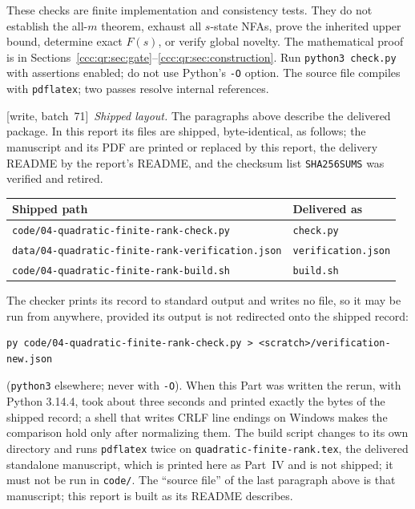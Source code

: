 \documentclass[11pt,letterpaper]{article}
\theoremstyle{definition}
\theoremstyle{remark}
\newcommand{\wsevone}{\textup{[write, batch~71]}}
\begin{document}
These checks are finite implementation and consistency tests. They do not
establish the all-$m$ theorem, exhaust all $s$-state NFAs, prove the
inherited upper bound, determine exact $F(s)$, or verify global novelty. The
mathematical proof is in
Sections~\ref{ccc:qr:sec:gate}--\ref{ccc:qr:sec:construction}. Run
\texttt{python3 check.py} with assertions enabled; do not use Python's
\texttt{-O} option. The source file compiles with \texttt{pdflatex}; two
passes resolve internal references.

\wsevone\ \emph{Shipped layout.} The paragraphs above describe the delivered
package. In this report its files are shipped, byte-identical, as follows;
the manuscript and its PDF are printed or replaced by this report, the
delivery README by the report's README, and the checksum list
\texttt{SHA256SUMS} was verified and retired.
\begin{center}\footnotesize
\begin{tabular}{@{}P{.62\textwidth}P{.32\textwidth}@{}}
\toprule
\textbf{Shipped path} & \textbf{Delivered as}\\
\midrule
\nolinkurl{code/04-quadratic-finite-rank-check.py} & \texttt{check.py}\\
\nolinkurl{data/04-quadratic-finite-rank-verification.json} & \texttt{verification.json}\\
\nolinkurl{code/04-quadratic-finite-rank-build.sh} & \texttt{build.sh}\\
\bottomrule
\end{tabular}
\end{center}
The checker prints its record to standard output and writes no file, so it
may be run from anywhere, provided its output is not redirected onto the
shipped record:
\begin{lstlisting}
py code/04-quadratic-finite-rank-check.py > <scratch>/verification-new.json
\end{lstlisting}
(\texttt{python3} elsewhere; never with \texttt{-O}). When this Part was
written the rerun, with Python 3.14.4, took about three seconds and printed
exactly the bytes of the shipped record; a shell that writes CRLF line
endings on Windows makes the comparison hold only after normalizing them. The
build script changes to its own directory and runs \texttt{pdflatex} twice on
\texttt{quadratic-finite-rank.tex}, the delivered standalone manuscript,
which is printed here as Part~IV and is not shipped; it must not be run in
\texttt{code/}. The ``source file'' of the last paragraph above is that
manuscript; this report is built as its README describes.
\end{document}
